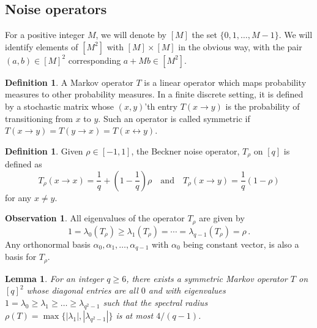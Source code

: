 \documentclass[10pt]{article}
\newtheorem{lemma}[theorem]{Lemma}
\theoremstyle{definition}
\newtheorem{definition}[theorem]{Definition}
\numberwithin{equation}{section}
\newtheorem{observation}[theorem]{Observation}
\newcommand{\xiffy}[2]{\ensuremath{{#1} \mathcal{\leftrightarrow} {#2}}}
\renewcommand{\ge}{\geqslant}
\begin{document}
\subsection{Noise  operators}
%
%
%
%
%
For a positive integer $M$, we will denote by $[M]$ the set
$\{0,1,\dots,M-1\}$.  We will identify elements of $[M^2]$ with $[M]
\times [M]$ in the obvious way, with the pair $(a,b) \in [M]^2$
corresponding $a + M b \in [M^2]$. 
%
%
\begin{definition}
  \label{def:markovop}
  A Markov operator $T$ is a linear operator which maps probability
  measures to other probability measures. In a finite discrete
  setting, it is defined by a stochastic matrix whose $(x,y)$'th entry
  $T(x \rightarrow y)$ is the probability of transitioning from $x$ to
  $y$. Such an operator is called symmetric if $T(x \rightarrow y) =
  T(y \rightarrow x) = T(\xiffy{x}{y})$.
\end{definition}
\begin{definition}
  \label{def:beckner}
  Given $\rho\in [-1,1]$, the Beckner noise operator, $T_{\rho}$ on
  $[q]$ is defined as \[
  T_\rho(x\rightarrow x) = \frac{1}{q} +
  \left(1-\frac{1}{q}\right) \rho\quad \text{and}\quad T_\rho(x\rightarrow y) =
  \frac{1}{q}(1-\rho)\] for any $x\neq y$. 
\end{definition}
%
\begin{observation}\label{obs:basis-id}
  All eigenvalues of the operator $T_{\rho}$ are given by \[1 =
  \lambda_0(T_\rho)\ge \lambda_1(T_\rho) = \cdots =
  \lambda_{q-1}(T_\rho) = \rho\,.\] Any orthonormal basis
  $\alpha_0,\alpha_1,\ldots,\alpha_{q-1}$ with $\alpha_0$ being
  constant vector, is also a basis for $T_{\rho}$.
\end{observation}
%
\begin{lemma}
  \label{lemma:T}
  For an integer $q \ge 6$, there exists a symmetric Markov operator
  $T$ on $[q]^2$ whose diagonal entries are all $0$ and with
  eigenvalues $1=\lambda_0\ge \lambda_1\ge \ldots\ge \lambda_{q^2-1}$
  such that the \emph{spectral radius} $\rho(T) =
  \max\{|\lambda_1|,|\lambda_{q^2-1}|\}$ is at most
  ${4}/{(q-1)}$.%
\end{lemma}
\end{document}
